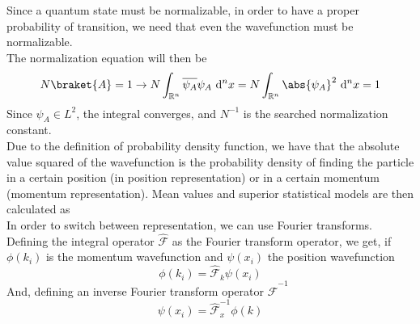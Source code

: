 \documentclass[a4paper, 11pt]{book}
\newcommand{\1}{\opr{\mathds{1}}}
\newcommand{\diff}[2][]{\ \mathrm{d}^{#1}#2}
\newcommand{\opr}[1]{\hat{#1}}
\theoremstyle{plain}
\begin{document}
	Since a quantum state must be normalizable, in order to have a proper probability of transition, we need that even the wavefunction must be normalizable.\\
	The normalization equation will then be
	\begin{equation}
		N\braket{A}=1\rightarrow N\int_{\mathbb{R}^n}\overline{\psi_A}\psi_A\diff[n]{x}=N\int_{\mathbb{R}^n}\abs{\psi_A}^2\diff[n]{x}=1
		\label{eq:normalization}
	\end{equation}
	Since $\psi_A\in L^2$, the integral converges, and $N^{-1}$ is the searched normalization constant.\\
	Due to the definition of probability density function, we have that the absolute value squared of the wavefunction is the probability density of finding the particle in a certain position (in position representation) or in a certain momentum (momentum representation). Mean values and superior statistical models are then calculated as \\
	In order to switch between representation, we can use Fourier transforms. Defining the integral operator $\opr{\mathcal{F}}$ as the Fourier transform operator, we get, if $\phi(k_i)$ is the momentum wavefunction and $\psi(x_i)$ the position wavefunction
	\begin{equation}
		\phi(k_i)=\opr{\mathcal{F}}_{k}\psi(x_i)
		\label{eq:fouriertransformmompos}
	\end{equation}
	And, defining an inverse Fourier transform operator $\opr{\mathcal{F}}^{-1}$
	\begin{equation}
		\psi(x_i)=\opr{\mathcal{F}}^{-1}_{x}\phi(k)
		\label{eq:fouriertrasformposmom}
	\end{equation}
\end{document}
